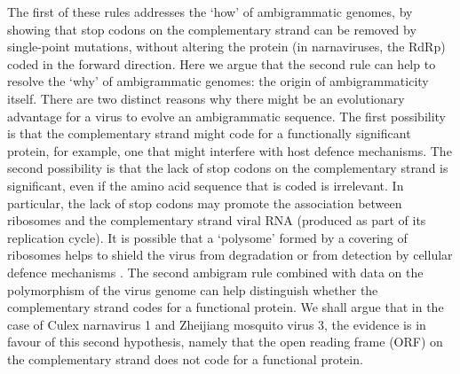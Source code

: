 \documentclass[unnumsec,webpdf,contemporary,large,namedate]{oup-authoring-template}%
\theoremstyle{thmstyleone}%
\theoremstyle{thmstyletwo}%
\theoremstyle{thmstylethree}%
\begin{document}
The first of these rules addresses the \lq how' of  ambigrammatic genomes, by showing that
stop codons on the complementary strand can be removed by single-point mutations, without
altering the protein (in narnaviruses, the RdRp) coded in the forward direction. Here we argue that the
second rule can help to resolve the \lq why' of ambigrammatic genomes:
the origin of ambigrammaticity itself. There are two
distinct reasons why there might be an evolutionary advantage for a virus to evolve an
ambigrammatic sequence. The first possibility is that the complementary strand might code
for a functionally significant protein, for example, one that might interfere with host defence mechanisms.
The second possibility is that the lack of stop codons on the complementary strand
is significant, even if the amino acid sequence that is coded is irrelevant. In particular, the lack of stop codons
may promote the association between ribosomes and the complementary strand viral RNA (produced as part of its
replication cycle). It is possible that a \lq polysome' formed by a covering of ribosomes helps to shield
the virus from degradation or from detection by cellular defence mechanisms \cite{Cep20,Ret+20,Wil+21}.
The second ambigram rule combined with data on the polymorphism of the
virus genome can help distinguish whether the complementary strand codes for a functional protein.
We shall argue that in the case of Culex narnavirus 1 and Zheijiang mosquito virus 3, the evidence
is in favour of this second hypothesis, namely that the open reading frame (ORF) on the complementary strand does
not code for a functional protein.
\end{document}

